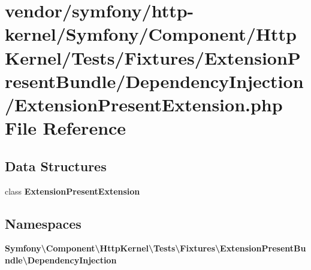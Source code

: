 \section{vendor/symfony/http-\/kernel/\+Symfony/\+Component/\+Http\+Kernel/\+Tests/\+Fixtures/\+Extension\+Present\+Bundle/\+Dependency\+Injection/\+Extension\+Present\+Extension.php File Reference}
\label{_extension_present_extension_8php}
\subsection*{Data Structures}
\begin{DoxyCompactItemize}
\item 
class {\bf Extension\+Present\+Extension}
\end{DoxyCompactItemize}
\subsection*{Namespaces}
\begin{DoxyCompactItemize}
\item 
 {\bf Symfony\textbackslash{}\+Component\textbackslash{}\+Http\+Kernel\textbackslash{}\+Tests\textbackslash{}\+Fixtures\textbackslash{}\+Extension\+Present\+Bundle\textbackslash{}\+Dependency\+Injection}
\end{DoxyCompactItemize}
